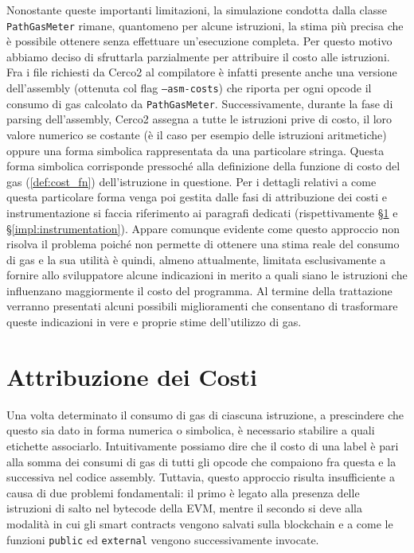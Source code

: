 \documentclass[12pt,a4paper,openright,oneside]{report}
\theoremstyle{definition}
\begin{document}
Nonostante queste importanti limitazioni, la simulazione condotta dalla classe \texttt{PathGasMeter} rimane, quantomeno per alcune istruzioni, la stima pi\`{u} precisa che \`{e} possibile ottenere senza effettuare un'esecuzione completa. Per questo motivo abbiamo deciso di sfruttarla parzialmente per attribuire il costo alle istruzioni. Fra i file richiesti da Cerco2 al compilatore \`{e} infatti presente anche una versione dell'assembly (ottenuta col flag \texttt{--asm-costs}) che riporta per ogni opcode il consumo di gas calcolato da \texttt{PathGasMeter}. Successivamente, durante la fase di parsing dell'assembly, Cerco2 assegna a tutte le istruzioni prive di costo, il loro valore numerico se costante (\`{e} il caso per esempio delle istruzioni aritmetiche) oppure una forma simbolica rappresentata da una particolare stringa. Questa forma simbolica corrisponde pressoch\'{e} alla definizione della funzione di costo del gas (\ref{def:cost_fn}) dell'istruzione in questione. Per i dettagli relativi a come questa particolare forma venga poi gestita dalle fasi di attribuzione dei costi e instrumentazione si faccia riferimento ai paragrafi dedicati (rispettivamente \S\ref{impl:costs_attribution} e \S\ref{impl:instrumentation}). Appare comunque evidente come questo approccio non risolva il problema poich\'{e} non permette di ottenere una stima reale del consumo di gas e la sua utilit\`{a} \`{e} quindi, almeno attualmente, limitata esclusivamente a fornire allo sviluppatore alcune indicazioni in merito a quali siano le istruzioni che influenzano maggiormente il costo del programma. Al termine della trattazione verranno presentati alcuni possibili miglioramenti che consentano di trasformare queste indicazioni in vere e proprie stime dell'utilizzo di gas.

\section{Attribuzione dei Costi}\label{impl:costs_attribution}
Una volta determinato il consumo di gas di ciascuna istruzione, a prescindere che questo sia dato in forma numerica o simbolica, \`{e} necessario stabilire a quali etichette associarlo. Intuitivamente possiamo dire che il costo di una label \`{e} pari alla somma dei consumi di gas di tutti gli opcode che compaiono fra questa e la successiva nel codice assembly. Tuttavia, questo approccio risulta insufficiente a causa di due problemi fondamentali: il primo \`{e} legato alla presenza delle istruzioni di salto nel bytecode della EVM, mentre il secondo si deve alla modalit\`{a} in cui gli smart contracts vengono salvati sulla blockchain e a come le funzioni \texttt{public} ed \texttt{external} vengono successivamente invocate.
\end{document}
